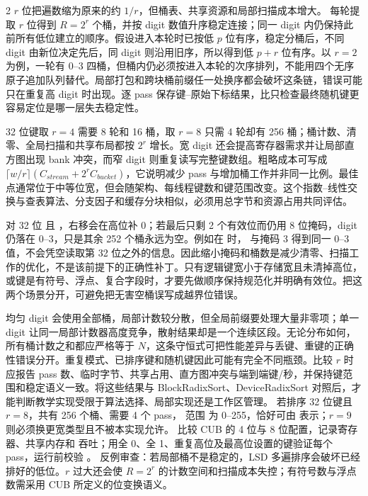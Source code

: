 \begin{solutionexercise}{2}
\conclusionheading $r$ 位把遍数缩为原来的约 $1/r$，但桶表、共享资源和局部扫描成本增大。
\discussionheading
{}每轮提取 $r$ 位得到 $R=2^r$ 个桶，并按 digit 数值升序稳定连接；同一 digit 内仍保持此前所有低位建立的顺序。假设进入本轮时已按低 $p$ 位有序，稳定分桶后，不同 digit 由新位决定先后，同 digit 则沿用旧序，所以得到低 $p+r$ 位有序。以 $r=2$ 为例，一轮有 0--3 四桶，但桶内仍必须按进入本轮的次序排列，不能用四个无序原子追加队列替代。局部打包和跨块桶前缀任一处换序都会破坏这条链，错误可能只在重复高 digit 时出现。逐 pass 保存键--原始下标结果，比只检查最终随机键更容易定位是哪一层失去稳定性。

32 位键取 $r=4$ 需要 8 轮和 16 桶，取 $r=8$ 只需 4 轮却有 256 桶；桶计数、清零、全局扫描和共享布局都按 $2^r$ 增长。宽 digit 还会提高寄存器需求并让局部直方图出现 bank 冲突，而窄 digit 则重复读写完整键数组。粗略成本可写成 $\lceil w/r\rceil(C_{stream}+2^rC_{bucket})$，它说明减少 pass 与增加桶工作并非同一比例。最佳点通常位于中等位宽，但会随架构、每线程键数和键范围改变。这个指数--线性交换与查表算法、分支因子和缓存分块相似，必须用总字节和资源占用共同评估。

对 32 位  且 ，右移会在高位补 0；若最后只剩 2 个有效位而仍用 8 位掩码，digit 仍落在 0--3，只是其余 252 个桶永远为空。例如在  时， 与掩码 3 得到同一 0--3 值，不会凭空读取第 32 位之外的信息。因此缩小掩码和桶数是减少清零、扫描工作的优化，不是该前提下的正确性补丁。只有逻辑键宽小于存储宽且未清掉高位，或键是有符号、浮点、复合字段时，才要先做顺序保持规范化并明确有效位。把这两个场景分开，可避免把无害空桶误写成越界位错误。

均匀 digit 会使用全部桶，局部计数较分散，但全局前缀要处理大量非零项；单一 digit 让同一局部计数器高度竞争，散射结果却是一个连续区段。无论分布如何，所有桶计数之和都应严格等于 $N$，这条守恒式可把性能差异与丢键、重键的正确性错误分开。重复模式、已排序键和随机键因此可能有完全不同瓶颈。比较 $r$ 时应报告 pass 数、临时字节、共享占用、直方图冲突与端到端键/秒，并保持键范围和稳定语义一致。将这些结果与 BlockRadixSort、DeviceRadixSort 对照后，才能判断教学实现受限于算法选择、局部实现还是工作区管理。
\variantheading 若排序 32 位键且 $r=8$，共有 256 个桶、需要 4 个 pass， 范围
为 0--255，恰好可由  表示；$r=9$ 则必须换更宽类型且不被本实现允许。
\practiceheading 比较 CUB  的 4 位与 8 位配置，记录寄存器、共享内存和
吞吐；用全 0、全 1、重复高位及最高位设置的键验证每个 pass，运行前校验
。
反例审查：若局部桶不是稳定的，LSD 多遍排序会破坏已经排好的低位。$r$ 过大还会使
$R=2^r$ 的计数空间和扫描成本失控；有符号数与浮点数需采用 CUB 所定义的位变换语义。
\end{solutionexercise}

